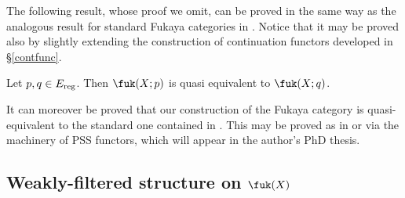 	\noindent The following result, whose proof we omit, can be proved in the same way as the analogous result for standard Fukaya categories in \cite[Chapter 10]{Se:book-fukaya-categ}. Notice that it may be proved also by slightly extending the construction of continuation functors developed in \S \ref{contfunc}.
	\begin{lemma}\label{inv1}
		Let $p,q\in E_\textnormal{reg}$. Then $\fuk(X;p)$ is quasi equivalent to $\fuk(X;q)$.
	\end{lemma}
	\noindent It can moreover be proved that our construction of the Fukaya category is quasi-equivalent to the standard one contained in \cite{Se:book-fukaya-categ}. This may be proved as in \cite{Sheridan2011OnPants} or via the machinery of PSS functors, which will appear in the author's PhD thesis.
	
	
	\subsection{Weakly-filtered structure on $\fuk(X)$}\label{wfs}
	
